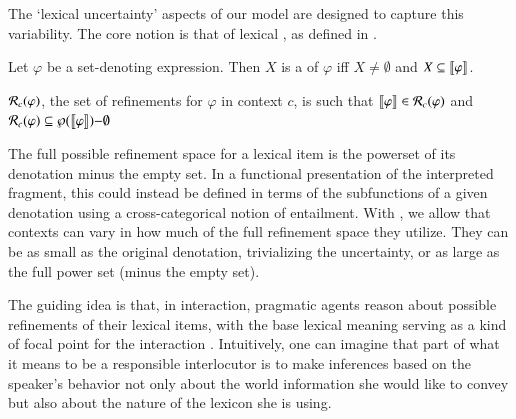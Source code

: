 \documentclass[leqno,12pt]{article}
\begin{document}
The `lexical uncertainty' aspects of our model are designed to capture
this variability. The core notion is that of lexical
, as defined in .
%
\begin{examples}
\item\label{refinement} 
  \begin{examples}
  \item Let $\varphi$ be a set-denoting expression. Then $X$ is a
     of $\varphi$ iff $X \neq \emptyset$ and $X
    \subseteq \llbracket\varphi\rrbracket$.
  \item\label{refine} $\mathcal{R}_{c}(\varphi)$, the set of refinements for
    $\varphi$ in context $c$, is such that
    $\llbracket\varphi\rrbracket \in \mathcal{R}_{c}(\varphi)$ and
    $\mathcal{R}_{c}(\varphi) \subseteq \wp(\llbracket\varphi\rrbracket){-}\emptyset$

  \end{examples}
\end{examples}
%
The full possible refinement space for a lexical item is the powerset
of its denotation minus the empty set. In a functional presentation of
the interpreted fragment, this could instead be defined in terms of
the subfunctions of a given denotation using a cross-categorical
notion of entailment. With , we allow that
contexts can vary in how much of the full refinement space they
utilize. They can be as small as the original denotation, trivializing
the uncertainty, or as large as the full power set (minus the empty
set).

The guiding idea is that, in interaction, pragmatic agents reason
about possible refinements of their lexical items, with the base
lexical meaning serving as a kind of focal point for the interaction
\citep{Franke09DISS}.  Intuitively, one can imagine that part of what
it means to be a responsible interlocutor is to make inferences based
on the speaker's behavior not only about the world information she
would like to convey but also about the nature of the lexicon she is
using.
\end{document}
